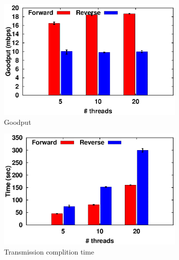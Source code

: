 \begin{figure}[!t]
	\begin{center}
		\begin{subfigure}{.46\linewidth}
			\includegraphics[width=0.95\linewidth]{img/mpquic-prob/goodPut-5.eps}
			\caption{\label{fig:Goodput-mpquic}Goodput}
		\end{subfigure}
		\hspace{0.1cm}
		\begin{subfigure}{.46\linewidth}
			\includegraphics[width=0.95\linewidth]{img/mpquic-prob/tymdiff-5.eps}
			\caption{\label{fig:flowcomplition-mpquic}Transmission complition time}
		\end{subfigure}
		
		\caption{\label{fig:mpquic-back}}
	\end{center}
\end{figure}

